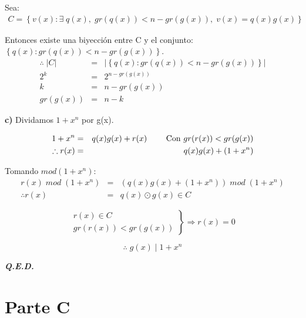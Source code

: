 \documentclass[12pt,a4paper]{report}
\newcommand{\QED}{\hfill \textit{\textbf{Q.E.D.}}}
\begin{document}
			\vspace{3mm}
			\par Sea:
			\begin{eqnarray}
				\nonumber C = \left\lbrace v(x) : \exists \; q(x), \; gr(q(x)) < n - gr(g(x)), \; v(x) = q(x) g(x) \right\rbrace
			\end{eqnarray}

			\par Entonces existe una biyección entre C y el conjunto: $\left\lbrace q(x) :  gr(q(x)) < n - gr(g(x)) \right\rbrace$.
			\begin{eqnarray}
				\nonumber \therefore \; \lvert C \rvert &=& \lvert \left\lbrace q(x) : gr(q(x)) < n - gr(g(x)) \right\rbrace \rvert \\
				\nonumber 2^{k} &=& 2^{n - gr(g(x))} \\
				\nonumber k &=& n - gr(g(x)) \\
				\nonumber gr(g(x)) &=& n - k
			\end{eqnarray}

			\textbf{c)} Dividamos $1 + x^{n}$ por g(x).
			
				\begin{eqnarray}
						\nonumber 1 + x^{n} &=& q(x) g(x) + r(x) \qquad \textup{ Con } gr(r(x)) < gr(g(x)) \\
						\nonumber \therefore r(x) &=& q(x) g(x) + (1 + x^{n})
				\end{eqnarray}
				
				\par Tomando $mod (1 + x^{n})$:
					\begin{eqnarray}
						\nonumber r(x) \; mod \; (1 + x^{n}) &=& (q(x) g(x) + (1 + x^{n})) \; mod \; (1 + x^{n}) \\
						\nonumber \therefore r(x) &=& q(x) \odot g(x) \in C
					\end{eqnarray}
					
				\begin{equation*}
	  				\left.
	  				\begin{array}{l}
	    				r(x) \in C \\
	    				gr(r(x)) < gr(g(x))
	  				\end{array}
	 				\right\rbrace
	 				\Rightarrow r(x) = 0
			\end{equation*}
			
			\[
				\therefore \; g(x) \; | \; 1 + x^{n}
			\]

		\QED


\chapter{Parte C}
\end{document}
